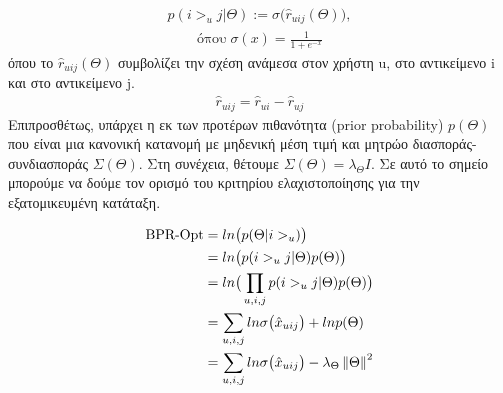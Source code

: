 \begin{align}
	p( i >_u j |\Theta) := \sigma \big(\hat r_{uij}(\Theta) \big),
\end{align}
\begin{align}
	\text{όπου} \;\sigma(x) = \frac{1}{1 + e^{-x}}
\end{align}
όπου το $ \hat r_{uij}(\Theta) $ συμβολίζει την σχέση ανάμεσα στον χρήστη u, στο αντικείμενο i και στο αντικείμενο j.
\begin{align}
	\hat r_{uij} = \hat r_{ui} - \hat r_{uj}
\end{align}
Επιπροσθέτως, υπάρχει η εκ των προτέρων πιθανότητα (prior probability) $ p(\Theta) $ που είναι μια κανονική κατανομή με μηδενική μέση τιμή και μητρώο διασποράς-συνδιασποράς $ \Sigma (\Theta)  $. Στη συνέχεια, θέτουμε $ \Sigma (\Theta) = \lambda_{\Theta} I $. Σε αυτό το σημείο μπορούμε να δούμε τον ορισμό του κριτηρίου ελαχιστοποίησης για την εξατομικευμένη κατάταξη.

\begin{align}
	\text{BPR-Opt} &= ln \big(p(\Theta | i >_u )\big) \\  \notag
	&=ln \big(p( i >_u j |\Theta) p(\Theta)\big)\\ \notag
	&= ln \big( \prod_{u, i, j} p( i >_u j |\Theta) p(\Theta) \big) \\ \notag
	&= \sum_{u, i, j} ln  \sigma \big(\hat x_{uij}\big) + ln p(\Theta) \\ \notag
	&= \sum_{u, i, j} ln  \sigma \big(\hat x_{uij}  \big) - \lambda_{\Theta} \left\Vert \Theta \right\Vert ^{2} 
	\label{eq:bprmf}
\end{align}

